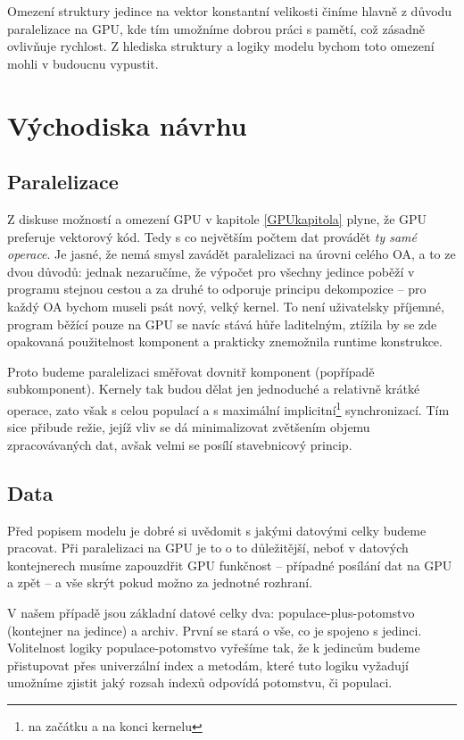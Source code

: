Omezení struktury jedince na vektor konstantní velikosti činíme hlavně z důvodu paralelizace na GPU, kde tím umožníme dobrou práci s pamětí, což zásadně ovlivňuje rychlost. Z hlediska struktury a logiky modelu bychom toto omezení mohli v budoucnu vypustit.

\section{Východiska návrhu}
\subsection{Paralelizace}

Z diskuse možností a omezení GPU v kapitole \ref{GPUkapitola} plyne, že GPU preferuje vektorový kód. Tedy s co největším počtem dat provádět \emph{ty samé operace}. Je jasné, že nemá smysl zavádět paralelizaci na úrovni celého OA, a to ze dvou důvodů: jednak nezaručíme, že výpočet pro všechny jedince poběží v programu stejnou cestou a za druhé to odporuje principu dekompozice -- pro každý OA bychom museli psát nový, velký kernel. To není uživatelsky příjemné, program běžící pouze na GPU se navíc stává hůře laditelným, ztížila by se zde opakovaná použitelnost komponent a prakticky znemožnila runtime konstrukce.

Proto budeme paralelizaci směřovat dovnitř komponent (popřípadě subkomponent). Kernely tak budou dělat jen jednoduché a relativně krátké operace, zato však s celou populací a s maximální implicitní\footnote{na začátku a na konci kernelu} synchronizací. Tím sice přibude režie, jejíž vliv se dá minimalizovat zvětšením objemu zpracovávaných dat, avšak velmi se posílí stavebnicový princip.

\subsection{Data}

Před popisem modelu je dobré si uvědomit s jakými datovými celky budeme pracovat. Při paralelizaci na GPU je to o to důležitější, neboť v datových kontejnerech musíme zapouzdřit GPU funkčnost -- případné posílání dat na GPU a zpět -- a vše skrýt pokud možno za jednotné rozhraní.

V našem případě jsou základní datové celky dva: populace-plus-potomstvo (kontejner na jedince) a archiv. První se stará o vše, co je spojeno s jedinci. Volitelnost logiky populace-potomstvo vyřešíme tak, že k jedincům budeme přistupovat přes univerzální index a metodám, které tuto logiku vyžadují umožníme zjistit jaký rozsah indexů odpovídá potomstvu, či populaci.

